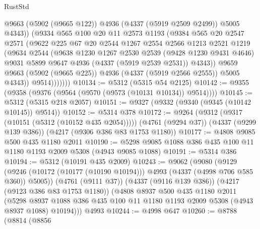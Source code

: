 \begin{lexlean}{RustStd}
\begin{coremodule}
                    @9663
                    (@5902 (@9665 @122))
                    @4936
                    (@4337 (@5919 @2509 @2499))
                    @5005
                    @4343))
                (@9334
                  @565
                  @100
                  @20
                  @11
                  @2573
                  @1193
                  (@9384
                    @565
                    @20
                    @2547
                    @2571
                    (@9622
                      @225
                      @67
                      @20
                      @2544
                      @1267
                      @2554
                      @2566
                      @1213
                      @2521
                      @1219
                      (@9634
                        @2544
                        (@9638
                          @1230
                          @1267
                          @2530
                          @2539
                          (@9428 @1230 @9431 @4646)
                          @9031
                          @5899
                          @9647
                          @4936
                          (@4337 (@5919 @2539 @2531))
                          @4343))
                      @9659
                      @9663
                      (@5902 (@9665 @225))
                      @4936
                      (@4337 (@5919 @2566 @2555))
                      @5005
                      @4343))
                  @9514)))))))
@10134 := @5312 (@5315 @54 @2125)
@10142 := @9355 (@9358 (@9376 (@9564 (@9570 (@9573 (@10131 @10134)) @9514))))
@10145 := @5312 (@5315 @218 @2057)
@10151 := @9327 (@9332 (@9340 (@9345 (@10142 @10145)) @9514))
@10152 := @5314 @378
@10172 := @9264
    (@9312 (@9317 (@10151 (@5312 (@10152 @435 @2054)))))
    (@4761 (@9294 @37))
    (@4337 (@9299 @139 @386))
    (@4217 (@9306 @386 @83 @1753 @1180))
@10177 := @4808 @9085 @500 @435 @1180 @2011
@10190 := @5298 @9085 @1088 @386 @435 @100 @11 @1180 @1193 @2009 @5308 (@4943 @9085 @1088)
@10191 := @5314 @386
@10194 := @5312 (@10191 @435 @2009)
@10243 := @9062
    (@9080
      (@9129 (@9246 (@10172 (@10177 (@10190 @10194))) @4993 (@4337 (@4998 @706 @585 @360)) @5005))
      (@4761 (@9111 @37))
      (@4337 (@9116 @139 @386))
      (@4217 (@9123 @386 @83 @1753 @1180))
      (@4808
        @8937
        @500
        @435
        @1180
        @2011
        (@5298 @8937 @1088 @386 @435 @100 @11 @1180 @1193 @2009 @5308 (@4943 @8937 @1088) @10194)))
    @4993
@10244 := @4998 @647
@10260 := @8788
    (@8814
      (@8856

\end{coremodule}
\end{lexlean}
